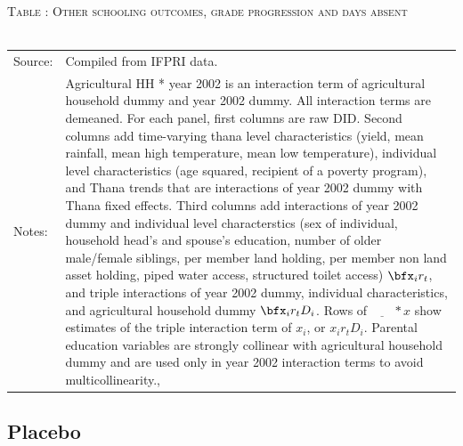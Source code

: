 \begin{table}\hfil\textsc{\footnotesize Table \thetable: Other schooling outcomes, grade progression and days absent\label{zEm.1999.10.sameN}}\\\setlength{\tabcolsep}{.5pt}\renewcommand{\arraystretch}{.675}\hspace{-2em}\hfil\\\renewcommand{\arraystretch}{1}\hfil\begin{tabular}{>{\hfill\scriptsize}p{1cm}<{}>{\scriptsize}p{12cm}<{\hfill}} Source:& Compiled from IFPRI data. \\[-1ex] Notes:&   \textsf{Agricultural HH * year 2002} is an interaction term of agricultural household dummy and year 2002 dummy. All interaction terms are demeaned. For each panel, first columns are raw DID. Second columns add time-varying thana level characteristics (yield, mean rainfall, mean high temperature, mean low temperature), individual level characteristics (age squared, recipient of a poverty program), and \textsf{Thana trends} that are interactions of year 2002 dummy with Thana fixed effects. Third columns add interactions of year 2002 dummy and individual level characterstics (sex of individual, household head's and spouse's education, number of older male/female siblings, per member land holding, per member non land asset holding, piped water access, structured toilet access) $\bfx_{i}r_{t}$, and triple interactions of year 2002 dummy, individual characteristics, and agricultural household dummy $\bfx_{i}r_{t}D_{i}$. Rows of $\underline{\phantom{mm}}*x$ show estimates of the triple interaction term of $x_{i}$, or $x_{i}r_{t}D_{i}$. Parental education variables are strongly collinear with agricultural household dummy and are used only in year 2002 interaction terms to avoid multicollinearity., \\   \end{tabular} \end{table}


\clearpage
\subsection{Placebo}

